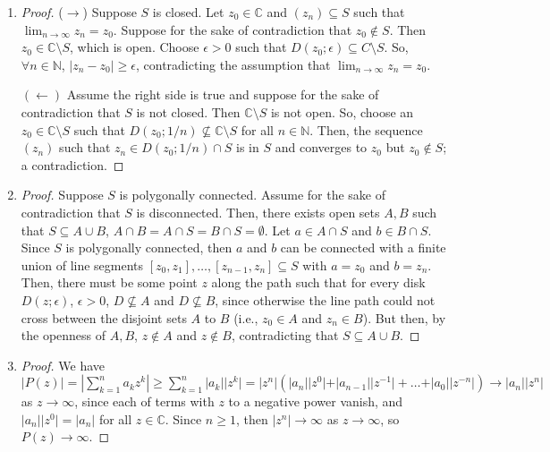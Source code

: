 \documentclass[11pt, letterpaper]{article}
\begin{document}
\begin{enumerate}
  \item \begin{proof}
    ($\rightarrow$) Suppose $S$ is closed. Let $z_0 \in \mathbb C$ and $(z_n) \subseteq S$ such that $\lim_{n \to \infty} z_n = z_0$. Suppose for the sake of contradiction that $z_0 \not\in S$. Then $z_0 \in \mathbb C \setminus S$, which is open. Choose $\epsilon > 0$ such that $D(z_0; \epsilon) \subseteq C \setminus S$. So, $\forall n \in \mathbb N$, $\vert z_n - z_0 \vert \geq \epsilon$, contradicting the assumption that $\lim_{n \to \infty} z_n = z_0$.

    $(\leftarrow)$ Assume the right side is true and suppose for the sake of contradiction that $S$ is not closed. Then $\mathbb C \setminus S$ is not open. So, choose an $z_0 \in \mathbb C \setminus S$ such that $D(z_0; 1/n) \not\subseteq \mathbb C \setminus S$ for all $n \in \mathbb N$. Then, the sequence $(z_n)$ such that $z_n \in D(z_0; 1/n) \cap S$ is in $S$ and converges to $z_0$ but $z_0 \not\in S$; a contradiction.
  \end{proof}

  \item \begin{proof}
    Suppose $S$ is polygonally connected. Assume for the sake of contradiction that $S$ is disconnected. Then, there exists open sets $A, B$ such that $S \subseteq A \cup B$, $A \cap B = A \cap S = B \cap S = \emptyset$. Let $a \in A \cap S$ and $b \in B \cap S$. Since $S$ is polygonally connected, then $a$ and $b$ can be connected with a finite union of line segments $[z_0, z_1], \dots, [z_{n - 1}, z_n] \subseteq S$ with $a = z_0$ and $b = z_n$. Then, there must be some point $z$ along the path such that for every disk $D(z; \epsilon)$, $\epsilon > 0$, $D \not\subseteq A$ and $D \not \subseteq B$, since otherwise the line path could not cross between the disjoint sets $A$ to $B$ (i.e., $z_0 \in A$ and $z_n \in B$). But then, by the openness of $A, B$, $z \not\in A$ and $z \not\in B$, contradicting that $S \subseteq A \cup B$.
  \end{proof} 
  
  \item \begin{proof}
    We have $\vert P(z) \vert = \left\vert \sum_{k = 1}^n a_k z^k \right\vert \geq \sum_{k = 1}^n \vert a_k \vert \vert z^k \vert = \vert z^n \vert (\vert a_n \vert \vert z^0 \vert + \vert a_{n - 1} \vert \vert z^{-1} \vert + \dots + \vert a_0 \vert \vert z^{-n} \vert) \to \vert a_n \vert \vert z^n \vert$ as $z \to \infty$, since each of terms with $z$ to a negative power vanish, and $\vert a_n \vert \vert z^0 \vert = \vert a_n \vert$ for all $z \in \mathbb C$. Since $n \geq 1$, then $\vert z^n \vert \to \infty$ as $z \to \infty$, so $P(z) \to \infty$.
  \end{proof}
\end{enumerate}
\end{document}
